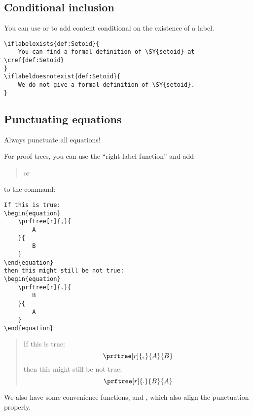 \subsection{Conditional inclusion}

You can use  or  to add content conditional on the existence of a label.

\begin{verbatim}
\iflabelexists{def:Setoid}{
    You can find a formal definition of \SY{setoid} at \cref{def:Setoid}
}
\iflabeldoesnotexist{def:Setoid}{
    We do not give a formal definition of \SY{setoid}.
}
\end{verbatim}

\subsection{Punctuating equations}

Always punctuate all equations!

For proof trees, you can use the ``right label function'' and add
%
\begin{quote}
    \centering
    \str{[r]{,}} \qquad or \qquad {} %
\end{quote}
%
to the  command:
%
\begin{verbatim}
If this is true:
\begin{equation}
    \prftree[r]{,}{
        A
    }{
        B
    }
\end{equation}
then this might still be not true:
\begin{equation}
    \prftree[r]{.}{
        B
    }{
        A
    }
\end{equation}
\end{verbatim}
\begin{quote}
    If this is true:
    \begin{equation}
        \prftree[r]{,}{
            A
        }{
            B
        }
    \end{equation}
    then this might still be not true:
    \begin{equation}
        \prftree[r]{.
        }{
            B
        }{
            A
        }
    \end{equation}
\end{quote}

We also have some convenience functions, \str{\\prfperiod} and \str{\\prfcomma},
which also align the punctuation properly.

